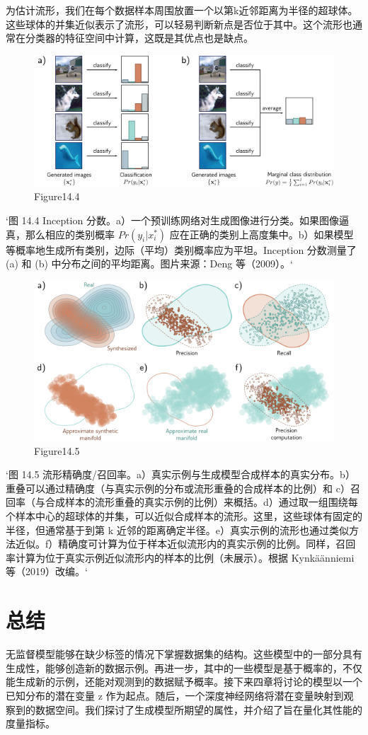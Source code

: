 为估计流形，我们在每个数据样本周围放置一个以第k近邻距离为半径的超球体。这些球体的并集近似表示了流形，可以轻易判断新点是否位于其中。这个流形也通常在分类器的特征空间中计算，这既是其优点也是缺点。

\begin{figure}[ht!]
\centering
\includegraphics[width=0.7\linewidth]{png/chapter14/UnsupInception.png}
\caption{Figure14.4}
\end{figure}

`图 14.4 Inception 分数。a）一个预训练网络对生成图像进行分类。如果图像逼真，那么相应的类别概率 \(Pr(y_i | x^*_i)\) 应在正确的类别上高度集中。b）如果模型等概率地生成所有类别，边际（平均）类别概率应为平坦。Inception 分数测量了 (a) 和 (b) 中分布之间的平均距离。图片来源：Deng 等（2009）。`

\begin{figure}[ht!]
\centering
\includegraphics[width=0.7\linewidth]{png/chapter14/UnsupPrecisionRecall.png}
\caption{Figure14.5}
\end{figure}

`图 14.5 流形精确度/召回率。a）真实示例与生成模型合成样本的真实分布。b）重叠可以通过精确度（与真实示例的分布或流形重叠的合成样本的比例）和 c）召回率（与合成样本的流形重叠的真实示例的比例）来概括。d）通过取一组围绕每个样本中心的超球体的并集，可以近似合成样本的流形。这里，这些球体有固定的半径，但通常基于到第 k 近邻的距离确定半径。e）真实示例的流形也通过类似方法近似。f）精确度可计算为位于样本近似流形内的真实示例的比例。同样，召回率计算为位于真实示例近似流形内的样本的比例（未展示）。根据 Kynkäänniemi 等（2019）改编。`
\section{总结}
无监督模型能够在缺少标签的情况下掌握数据集的结构。这些模型中的一部分具有生成性，能够创造新的数据示例。再进一步，其中的一些模型是基于概率的，不仅能生成新的示例，还能对观测到的数据赋予概率。接下来四章将讨论的模型以一个已知分布的潜在变量 z 作为起点。随后，一个深度神经网络将潜在变量映射到观察到的数据空间。我们探讨了生成模型所期望的属性，并介绍了旨在量化其性能的度量指标。

